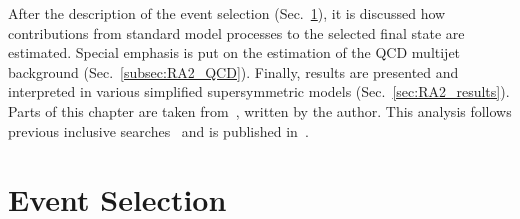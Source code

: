 After the description of the event selection (Sec.~\ref{sec:RA2_sel}), it is discussed how contributions from standard model processes to the selected final state are estimated. Special emphasis is put on the estimation of the QCD multijet background (Sec.~\ref{subsec:RA2_QCD}). Finally, results are presented and interpreted in various simplified supersymmetric models (Sec.~\ref{sec:RA2_results}). Parts of this chapter are taken from~\cite{bib:AN-12-350}, written by the author. This analysis follows previous inclusive searches~\cite{springerlink:10.1007/JHEP08(2011)155, Chatrchyan:2012lia} and is published in~\cite{Chatrchyan:2014lfa}.
    
\section{Event Selection}
\label{sec:RA2_sel}
